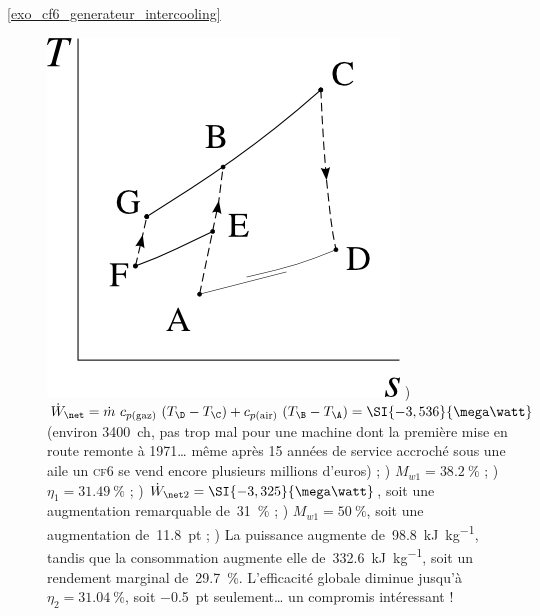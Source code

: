 \begin{description}
	 	\item [\ref{exo_cf6_generateur_intercooling}]
	 		\includegraphics[width=\solutiondiagramwidth]{images/exo_sol_ts_intercooler.png}
	 		) $\dot W_\net = \dot m \ c_{p \text{(gaz)}} \ (T_\D - T_\C) + c_{p \text{(air)}} \ (T_\B - T_\A) = \SI{-3,536}{\mega\watt}$ (environ \SI{3400}{ch}, pas trop mal pour une machine dont la première mise en route remonte à 1971… même après 15 années de service accroché sous une aile un \textsc{cf6} se vend encore plusieurs millions d’euros) ;
	 		) $M_{w1} = \SI{38,2}{\percent}$ ;
	 		) $\eta_1 = \SI{31,49}{\percent}$ ;
	 		) $\dot W_{\net 2} = \SI{-3,325}{\mega\watt}$, soit une augmentation remarquable de~\SI{31}{\percent} ;
	 		) $M_{w1} = \SI{50}{\percent}$, soit une augmentation de~\SI{+11,8}{pt} ;
	 		) La puissance augmente de~\SI{98,8}{\kilo\joule\per\kilogram}, tandis que la consommation augmente elle de~\SI{332,6}{\kilo\joule\per\kilogram}, soit un rendement marginal de~\SI{29,7}{\percent}. L’efficacité globale diminue jusqu’à $\eta_2 = \SI{31,04}{\percent}$, soit \SI{-0,5}{pt} seulement… un compromis intéressant !
	\end{description}

